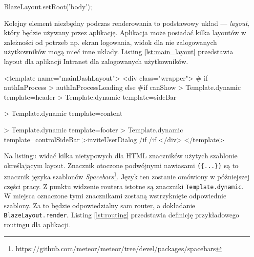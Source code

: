 \begin{js}[caption={Wskazanie elementu do renderowania szablonów},label={lst:blaze_layout}]
BlazeLayout.setRoot('body');
\end{js}
Kolejny element niezbędny podczas renderowania to podstawowy układ --- \textit{layout}, który będzie używany przez aplikację. Aplikacja może posiadać kilka layoutów w zależności od potrzeb np. ekran logowania, widok dla nie zalogowanych użytkowników mogą mieć inne układy. Listing \ref{lst:main_layout} przedstawia layout dla aplikacji Intranet dla zalogowanych użytkowników.
\begin{html}[caption={Główny layout dla aplikacji},label={lst:main_layout}]
<template name="mainDashLayout">
    <div class="wrapper">
        {{# if authInProcess }}
            {{> authInProcessLoading}}
        {{else}}
            {{#if canShow }}
                    {{> Template.dynamic template=header}}
                    {{> Template.dynamic template=sideBar}}

                    {{> Template.dynamic template=content}}

                    {{> Template.dynamic template=footer}}
                    {{> Template.dynamic template=controlSideBar}}
                    {{>inviteUserDialog}}
            {{/if}}
        {{/if}}
    </div>
</template>
\end{html}
Na listingu widać kilka nietypowych dla HTML znaczników użytych szablonie określającym layout. Znacznik otoczone podwójnymi nawiasami \verb|{{...}}| są to znacznik języka szablonów \emph{Spacebars}\footnote{https://github.com/meteor/meteor/tree/devel/packages/spacebars}. Język ten zostanie omówiony w późniejszej części pracy. Z punktu widzenie routera istotne są znaczniki \verb|Template.dynamic|. W miejsca oznaczone tymi znacznikami zostaną wstrzyknięte odpowiednie szablony. Za to będzie odpowiedzialny sam router, a dokładanie \verb|BlazeLayout.render|. Listing \ref{lst:routing} przedstawia definicję przykładowego routingu dla aplikacji.
